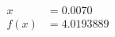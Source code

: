 \documentclass[preview]{standalone}
\begin{document}
\begin{align*}
x &= 0.0070\\f(x) &= 4.0193889
\end{align*}
\end{document}

